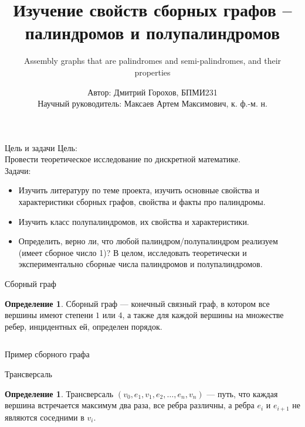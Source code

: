 \documentclass[14pt, aspectratio=169, notheorems]{beamer}
\title[Изучение свойств сборных графов]{Изучение свойств сборных графов – палиндромов и полупалиндромов}
\subtitle{Assembly graphs that are palindromes and semi-palindromes, and their properties}
\author[Дмитрий Горохов, БПМИ231]{Автор: Дмитрий Горохов, БПМИ231 \\ Научный руководитель: Максаев Артем Максимович, к. ф.-м. н.}
\date{}
\theoremstyle{plain}
\theoremstyle{definition}
\newtheorem{definition}[theorem]{Определение}
\theoremstyle{remark}
\begin{document}
\titlepage

\begin{frame}{Цель и задачи}
    Цель: \\ Провести теоретическое исследование по дискретной математике.
    \\
    
    Задачи: 
    \begin{itemize}
        \item Изучить литературу по теме проекта, изучить основные свойства и характеристики сборных графов, свойства и факты про палиндромы.
        \item Изучить класс полупалиндромов, их свойства и характеристики.
        \item Определить, верно ли, что любой палиндром/полупалиндром реализуем (имеет сборное число 1)? В целом, исследовать теоретически и экспериментально сборные числа палиндромов и полупалиндромов. 
    \end{itemize}
\end{frame}

\begin{frame}{Сборный граф}

   \begin{definition}
    Сборный граф --- конечный связный граф, в котором все вершины имеют степени $1$ или $4$, а также для каждой вершины на множестве ребер, инцидентных ей, определен порядок.
    \end{definition} 
    \begin{columns}
        \centering
        
        \centering
        
    \end{columns}
     
\end{frame}

\begin{frame}{Пример сборного графа}
    \centering
    
\end{frame}

\begin{frame}{Трансверсаль}
    \begin{definition}
    Трансверсаль $(v_0, e_1, v_1, e_2, \dots, e_n, v_n)$ --- путь, что каждая вершина встречается максимум два раза, все ребра различны, а ребра $e_i$ и $e_{i + 1}$ не являются соседними в $v_i$.
    \end{definition}

    \centering
    
\end{frame}
\end{document}
